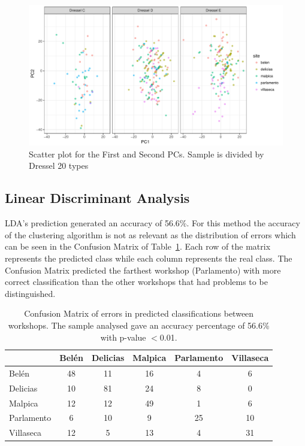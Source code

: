 \documentclass[review]{elsarticle}
\begin{document}
\begin{figure}[htp]
	\centering
\includegraphics[width=\linewidth]{figs/dresseltypes}
\caption{Scatter plot for the First and Second PCs. Sample is divided by Dressel 20 types}
\label{dressel}
\end{figure} 


\subsection{Linear Discriminant Analysis}

LDA's prediction generated an accuracy of 56.6\%. For this method the accuracy of the clustering algorithm is not as relevant as the distribution of errors which can be seen in the Confusion Matrix of Table~\ref{table:confusion}. Each row of the matrix represents the predicted class while each column represents the real class. The Confusion Matrix predicted the farthest workshop (Parlamento) with more correct classification than the other workshops that had problems to be distinguished. 

\begin{table}[htp]
\begin{tabular}{lccccc}
\hline
      & Belén & Delicias & Malpica & Parlamento & Villaseca\\ \hline
Belén & 48 & 11 & 16 & 4 & 6 \\
Delicias & 10 & 81 & 24 & 8 & 0 \\
Malpica & 12 & 12 & 49 & 1 & 6 \\
Parlamento & 6 & 10 & 9 & 25 & 10 \\
Villaseca & 12 & 5 & 13 & 4 & 31 \\
\hline

\end{tabular}
\caption{Confusion Matrix of errors in predicted classifications between workshops. The sample analysed gave an accuracy percentage of 56.6\% with p-value $<$0.01. }
\label{table:confusion}
\end{table}
\end{document}
